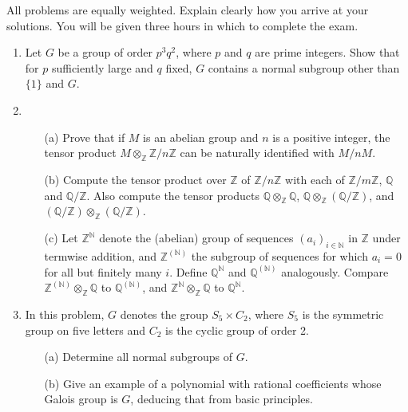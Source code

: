 \documentclass{article}
\begin{document}
All problems are equally weighted. Explain clearly how you arrive at your solutions. You will be given three hours in which to complete the exam.

\begin{enumerate}
    \item Let \(G\) be a group of order \(p^3q^2\), where \(p\) and \(q\) are prime integers. Show that for \(p\) sufficiently large and \(q\) fixed, \(G\) contains a normal subgroup other than \(\{1\}\) and \(G\).

    \item 
    \begin{itemize}
        \item[(a)] Prove that if \(M\) is an abelian group and \(n\) is a positive integer, the tensor product \(M\otimes_{\mathbb{Z}}\mathbb{Z}/n\mathbb{Z}\) can be naturally identified with \(M/nM\).
        \item[(b)] Compute the tensor product over \(\mathbb{Z}\) of \(\mathbb{Z}/n\mathbb{Z}\) with each of \(\mathbb{Z}/m\mathbb{Z}\), \(\mathbb{Q}\) and \(\mathbb{Q}/\mathbb{Z}\). Also compute the tensor products \(\mathbb{Q}\otimes_{\mathbb{Z}}\mathbb{Q}\), \(\mathbb{Q}\otimes_{\mathbb{Z}}(\mathbb{Q}/\mathbb{Z})\), and \((\mathbb{Q}/\mathbb{Z})\otimes_{\mathbb{Z}}(\mathbb{Q}/\mathbb{Z})\).
        \item[(c)] Let \(\mathbb{Z}^\mathbb{N}\) denote the (abelian) group of sequences \((a_i)_{i\in\mathbb{N}}\) in \(\mathbb{Z}\) under termwise addition, and \(\mathbb{Z}^{(\mathbb{N})}\) the subgroup of sequences for which \(a_i = 0\) for all but finitely many \(i\). Define \(\mathbb{Q}^\mathbb{N}\) and \(\mathbb{Q}^{(\mathbb{N})}\) analogously. Compare \(\mathbb{Z}^{(\mathbb{N})}\otimes_{\mathbb{Z}}\mathbb{Q}\) to \(\mathbb{Q}^{(\mathbb{N})}\), and \(\mathbb{Z}^\mathbb{N}\otimes_{\mathbb{Z}}\mathbb{Q}\) to \(\mathbb{Q}^\mathbb{N}\).
    \end{itemize}

    \item In this problem, \(G\) denotes the group \(S_5 \times C_2\), where \(S_5\) is the symmetric group on five letters and \(C_2\) is the cyclic group of order 2.
    \begin{itemize}
        \item[(a)] Determine all normal subgroups of \(G\).
        \item[(b)] Give an example of a polynomial with rational coefficients whose Galois group is \(G\), deducing that from basic principles.
    \end{itemize}


\end{enumerate}
\end{document}
